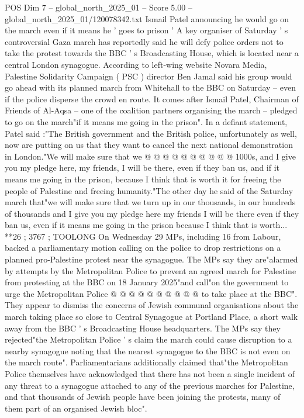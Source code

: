 \begin{textsample}{POS Dim 7 – global\_north\_2025\_01 – Score 5.00 – global\_north\_2025\_01/120078342.txt}  \label{ex:f7_pos_275}
Ismail Patel announcing he would go on the march even if it means he ' goes to prison ' A key organiser of Saturday ' s controversial Gaza march has reportedly said he will defy police orders not to take the protest towards the BBC ' s Broadcasting House, which is located near a central London synagogue.
According to left-wing website Novara Media, Palestine Solidarity Campaign ( PSC ) director Ben Jamal said his group would go ahead with its planned march from Whitehall to the BBC on Saturday -- even if the police disperse the crowd en route.
It comes after Ismail Patel, Chairman of Friends of Al-Aqsa -- one of the coalition partners organising the march -- pledged to go on the march"if it means me going in the prison".
In a defiant statement, Patel said :"The British government and the British police, unfortunately as well, now are putting on us that they want to cancel the next national demonstration in London."We will make sure that we @ @ @ @ @ @ @ @ @ @ 1000s, and I give you my pledge here, my friends, I will be there, even if they ban us, and if it means me going in the prison, because I think that is worth it for freeing the people of Palestine and freeing humanity."The other day he said of the Saturday march that"we will make sure that we turn up in our thousands, in our hundreds of thousands and I give you my pledge here my friends I will be there even if they ban us, even if it means me going in the prison because I think that is worth... **26 ; 3767 ; TOOLONG On Wednesday 29 MPs, including 16 from Labour, backed a parliamentary motion calling on the police to drop restrictions on a planned pro-Palestine protest near the synagogue.
The MPs say they are"alarmed by attempts by the Metropolitan Police to prevent an agreed march for Palestine from protesting at the BBC on 18 January 2025"and call"on the government to urge the Metropolitan Police @ @ @ @ @ @ @ @ @ @ to take place at the BBC".
They appear to dismiss the concerns of Jewish communal organisations about the march taking place so close to Central Synagogue at Portland Place, a short walk away from the BBC ' s Broadcasting House headquarters.
The MPs say they rejected"the Metropolitan Police ' s claim the march could cause disruption to a nearby synagogue noting that the nearest synagogue to the BBC is not even on the march route".
Parliamentarians additionally claimed that"the Metropolitan Police themselves have acknowledged that there has not been a single incident of any threat to a synagogue attached to any of the previous marches for Palestine, and that thousands of Jewish people have been joining the protests, many of them part of an organised Jewish bloc".

\end{textsample}

